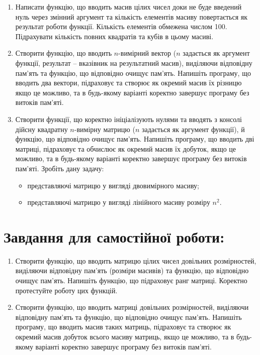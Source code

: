 \documentclass[a5paper,titlepage,openany,twoside,
]
{book_unv}%
\begin{document}
\begin{enumerate}
\begin{enumerate}
\item
  Написати функцію, що вводить масив цілих чисел доки не буде введений нуль
  через змінний аргумент та кількість елементів масиву повертається як
  результат роботи функції. Кількість елементів обмежена числом 100.
  Підрахувати кількість повних квадратів та кубів в цьому масиві.
\item
  Створити функцію, що вводить $n$-вимірний вектор ($n$
  задається як аргумент функції, результат -- вказівник на результатний масив),
 виділяючи відповідну пам'ять та функцію, що відповідно очищує пам'ять. 
 Напишіть програму, що вводить два вектори, підраховує та створює як окремий масив їх
  різницю якщо це можливо, та в будь-якому варіанті коректно
  завершує програму без витоків пам'яті.
\item
  Створити функції, що коректно ініціалізують нулями та вводять з консолі 
дійсну квадратну $n$-вимірну матрицю ($n$ задається як аргумент функції), й
  функцію, що відповідно очищує пам'ять. Напишіть програму, що вводить
  дві матриці, підраховує та обчислює як окремий масив їх добуток, якщо
  це можливо, та в будь-якому варіанті коректно завершує програму без
  витоків пам'яті. Зробіть дану задачу:
  \begin{itemize}
  \item
представляючі матрицю у вигляді двовимірного масиву;
  \item
представляючі матрицю у вигляді лінійного масиву розміру $n^{2}$.
 \end{itemize}

\end{enumerate}

\section{Завдання для самостійної роботи:}

\begin{enumerate}
\def\labelenumi{\arabic{enumi})}
\setcounter{enumi}{4}
\item
  Створити функцію, що вводить матрицю цілих чисел довільних
  розмірностей, виділяючи відповідну пам'ять (розміри масивів) та
  функцію, що відповідно очищує пам'ять. Напишіть функцію, що підраховує
  ранг матриці. Коректно протестуйте роботу цих функцій.
\item
  Створити функцію, що вводить матриці довільних розмірностей, виділяючи
  відповідну пам'ять та функцію, що відповідно очищує пам'ять. Напишіть
  програму, що вводить масив таких матриць, підраховує та створює як
  окремий масив добуток всього масиву матриць, якщо це можливо, та в
  будь-якому варіанті коректно завершує програму без витоків пам'яті.


\end{enumerate}
\end{enumerate}
\end{document}
